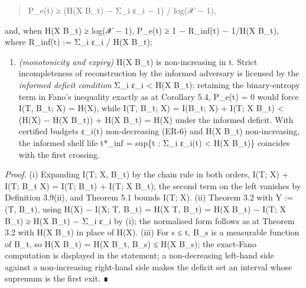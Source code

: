 \documentclass[
  11pt,
]{article}
\providecommand{\tightlist}{%
  \setlength{\itemsep}{0pt}\setlength{\parskip}{0pt}}
\begin{document}
\begin{quote}
P\_e(t) ≥ (H(X \textbar{} B\_t) − Σ\_i ε\_i − 1) /
log(\textbar 𝒳\textbar{} − 1),
\end{quote}

and, when H(X \textbar{} B\_t) ≥ log(\textbar 𝒳\textbar{} − 1), P\_e(t)
≥ 1 − R\_inf(t) − 1/H(X \textbar{} B\_t), where R\_inf(t) := Σ\_i ε\_i /
H(X \textbar{} B\_t);

\begin{enumerate}
\def\labelenumi{(\roman{enumi})}
\setcounter{enumi}{2}
\tightlist
\item
  \emph{(monotonicity and expiry)} H(X \textbar{} B\_t) is
  non-increasing in t. Strict incompleteness of reconstruction by the
  informed adversary is licensed by the \emph{informed deficit
  condition} Σ\_i ε\_i \textless{} H(X \textbar{} B\_t): retaining the
  binary-entropy term in Fano's inequality exactly as at Corollary 5.4,
  P\_e(t) = 0 would force I(T, B\_t; X) = H(X), while I(T, B\_t; X) =
  I(B\_t; X) + I(T; X \textbar{} B\_t) \textless{} (H(X) − H(X
  \textbar{} B\_t)) + H(X \textbar{} B\_t) = H(X) under the informed
  deficit. With certified budgets ε\_i(t) non-decreasing (ER-6) and H(X
  \textbar{} B\_t) non-increasing, the informed shelf life t*\_inf =
  sup\{t : Σ\_i ε\_i(t) \textless{} H(X \textbar{} B\_t)\} coincides
  with the first crossing.
\end{enumerate}

\emph{Proof.} (i) Expanding I(T; X, B\_t) by the chain rule in both
orders, I(T; X) + I(T; B\_t \textbar{} X) = I(T; B\_t) + I(T; X
\textbar{} B\_t); the second term on the left vanishes by Definition
3.9(ii), and Theorem 5.1 bounds I(T; X). (ii) Theorem 3.2 with Y := (T,
B\_t), using H(X) − I(X; T, B\_t) = H(X \textbar{} T, B\_t) = H(X
\textbar{} B\_t) − I(T; X \textbar{} B\_t) ≥ H(X \textbar{} B\_t) − Σ\_i
ε\_i by (i); the normalised form follows as at Theorem 3.2 with H(X
\textbar{} B\_t) in place of H(X). (iii) For s ≤ t, B\_s is a measurable
function of B\_t, so H(X \textbar{} B\_t) = H(X \textbar{} B\_t, B\_s) ≤
H(X \textbar{} B\_s); the exact-Fano computation is displayed in the
statement; a non-decreasing left-hand side against a non-increasing
right-hand side makes the deficit set an interval whose supremum is the
first exit. ∎
\end{document}
